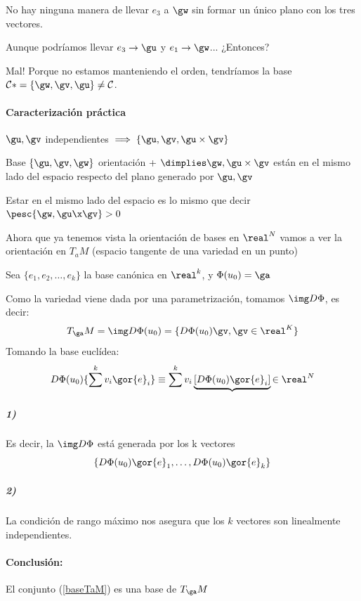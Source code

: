 No hay ninguna manera de llevar $e_3$ a $\gw$ sin formar un único plano con los tres vectores. 

Aunque podríamos llevar $e_3 \to \gu$ y $e_1 \to \gw$... ¿Entonces?

Mal! Porque no estamos manteniendo el orden, tendríamos la base $\mathcal{C}* = \{\gw,\gv,\gu\}\neq\mathcal{C}$.


\paragraph{Caracterización práctica}
\begin{lemma}
\label{thmProdVect}
$\gu,\gv$ independientes $\implies \{ \gu,\gv,\gu\times\gv \}$
\end{lemma}

\begin{lemma} Base $\{\gu,\gv,\gw\}$ orientación + $\dimplies \gw,\gu\times\gv$ están en el mismo lado del espacio respecto del plano generado por $\gu,\gv$
\end{lemma}
\obs Estar en el mismo lado del espacio es lo mismo que decir $\pesc{\gw,\gu\x\gv} > 0$

Ahora que ya tenemos vista la orientación de bases en $\real^N$ vamos a ver la orientación en $T_a M$ (espacio tangente de una variedad en un punto)


Sea $\{e_1,e_2,\dotsc,e_k\}$ la base canónica en $\real^k$, y $\Phi(u_0)=\ga$

Como la variedad viene dada por una parametrización, tomamos $\img D\Phi$, es decir: \[T_{\ga}M = \img D\Phi(u_0)  = \{D\Phi(u_0)\gv,\gv\in\real^K\}\]
Tomando la base euclídea:
\[D\Phi(u_0) \{\sum^k v_i\gor{e}_i\}\equiv \sum^k v_i\underbrace{[D\Phi(u_0)\gor{e}_i]}{\in\real^N} \]

\subparagraph{1)}Es decir, la $\img D\Phi$ está generada por los k vectores \begin{equation}\label{baseTaM}
\{ D\Phi(u_0)\gor{e}_1,\dotsc ,D\Phi(u_0)\gor{e}_k \}
\end{equation}

\subparagraph{2)}
La condición de rango máximo nos asegura que los $k$ vectores son linealmente independientes.

\paragraph{Conclusión:} El conjunto (\ref{baseTaM}) es una base de $T_{\ga}M$

